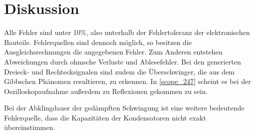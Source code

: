 \section{Diskussion}
Alle Fehler sind unter 10\%, also unterhalb der Fehlertoleranz der elektronischen Bauteile. Fehlerquellen sind dennoch möglich, so besitzen die Ausgleichsrechnungen die angegebenen Fehler. Zum Anderen entstehen Abweichungen durch ohmsche Verluste und Ablesefehler. Bei den generierten Dreieck- und Rechtecksignalen sind zudem die Überschwinger, die aus dem Gibbschen Phänomen resultieren, zu erkennen. In \autoref{scope_247} scheint es bei der Oszilloskopaufnahme außerdem zu Reflexionen gekommen zu sein.\par
Bei der Abklingdauer der gedämpften Schwingung ist eine weitere bedeutende Fehlerquelle, dass die Kapazitäten der Kondensatoren nicht exakt übereinstimmen.

\printbibliography
